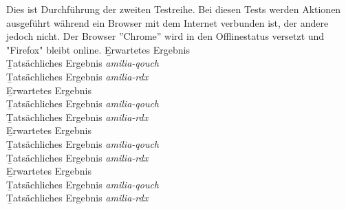 Dies ist Durchführung der zweiten Testreihe.
Bei diesen Tests werden Aktionen ausgeführt während ein Browser mit dem Internet verbunden ist, der andere jedoch nicht.
Der Browser ''Chrome'' wird in den Offlinestatus versetzt und "Firefox" bleibt online.
% 
\b{Erwartetes Ergebnis}\\
\b{Tatsächliches Ergebnis \it{amilia-qouch}}\\
\b{Tatsächliches Ergebnis \it{amilia-rdx}}\\
%
\b{Erwartetes Ergebnis}\\
\b{Tatsächliches Ergebnis \it{amilia-qouch}}\\
\b{Tatsächliches Ergebnis \it{amilia-rdx}}\\
%
\b{Erwartetes Ergebnis}\\
\b{Tatsächliches Ergebnis \it{amilia-qouch}}\\
\b{Tatsächliches Ergebnis \it{amilia-rdx}}\\
%
\b{Erwartetes Ergebnis}\\
\b{Tatsächliches Ergebnis \it{amilia-qouch}}\\
\b{Tatsächliches Ergebnis \it{amilia-rdx}}\\